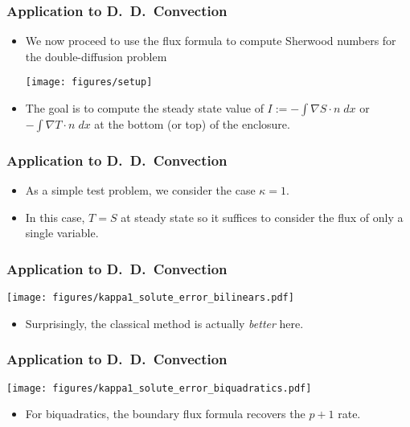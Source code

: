 \begin{frame}
  \frametitle{Application to D.~D.\ Convection}
  \begin{itemize}
    \item{ We now proceed to use the flux formula to
      compute Sherwood numbers for the double-diffusion problem
      \vspace{-.2in}
      \begin{center}
	\texttt{[image: figures/setup]}
      \end{center}
    }
    \item{The goal is to compute the steady state value of 
      $I := -\int\nabla S \cdot n \;dx$ or $-\int\nabla T \cdot n \;dx$
      at the bottom (or top) of the enclosure.}
  \end{itemize}
\end{frame}



\begin{frame}
  \frametitle{Application to D.~D.\ Convection}
  \begin{itemize}
    \item{As a simple test problem, we consider the case $\kappa=1$.}
    \item{In this case, $T=S$ at steady state so it suffices to consider
      the flux of only a single variable. }
  \end{itemize}
\end{frame}

\begin{frame}
  \frametitle{Application to D.~D.\ Convection}
    \vspace{-.25in}
    \begin{center}
	\texttt{[image: figures/kappa1\_solute\_error\_bilinears.pdf]}    
  \end{center}
    \vspace{-.2in}
    \begin{itemize}
      \item{Surprisingly, the classical method is actually \emph{better} here.}
    \end{itemize}
\end{frame}

\begin{frame}
  \frametitle{Application to D.~D.\ Convection}\vspace{-.25in}
    \begin{center}
	\texttt{[image: figures/kappa1\_solute\_error\_biquadratics.pdf]}    
  \end{center}
\vspace{-.2in}
    \begin{itemize}
      \item{For biquadratics, the boundary flux formula recovers the $p+1$ rate.}
    \end{itemize}
\end{frame}
